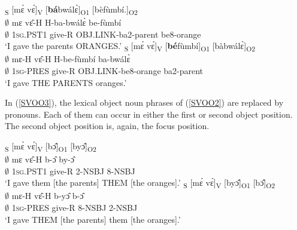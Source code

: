 \begin{exe}
\ex\label{SVOO2}
\begin{xlist}
\ex\label{SVOO2a}
  \glll [$\emptyset$]\textsubscript{S} [mɛ̀ vɛ́]\textsubscript{V} [{\bfseries bá}bwálɛ̀]\textsubscript{O1} [bèfùmbí.]\textsubscript{O2} \\
     $\emptyset$   mɛ vɛ̂-H H-ba-bwálɛ̀ be-fùmbí\\
      $\emptyset$     1\textsc{sg}.PST1 give-R OBJ.LINK-ba2-parent be8-orange  \\
    \trans `I gave the parents ORANGES.'
\ex \label{SVOO2b}
  \glll [$\emptyset$]\textsubscript{S}  [mɛ́ vɛ́]\textsubscript{V} [{\bfseries bé}fùmbí]\textsubscript{O1} [bàbwálɛ̀]\textsubscript{O2} \\
    $\emptyset$   mɛ-H vɛ̂-H H-be-fùmbí ba-bwálɛ̀ \\
      $\emptyset$   1\textsc{sg}-PRES give-R OBJ.LINK-be8-orange ba2-parent  \\
    \trans `I gave THE PARENTS oranges.'
\end{xlist}
\end{exe} 

\noindent In (\ref{SVOO3}), the lexical object noun phrases of (\ref{SVOO2}) are replaced by pronouns. Each of them can occur in either the first or second object position. The second object position is, again, the focus position.

\begin{exe}
\ex\label{SVOO3}
\begin{xlist}
\ex\label{SVOO3a}
  \glll [$\emptyset$]\textsubscript{S} [mɛ̀ vɛ́]\textsubscript{V} [bɔ̂]\textsubscript{O1} [byɔ̂]\textsubscript{O2} \\
       $\emptyset$ mɛ vɛ̂-H b-ɔ̂ by-ɔ̂\\
        $\emptyset$   1\textsc{sg}.PST1 give-R 2-NSBJ 8-NSBJ  \\
    \trans `I gave them [the parents] THEM [the oranges].'
\ex \label{SVOO3b}
  \glll [$\emptyset$]\textsubscript{S}  [mɛ́ vɛ́]\textsubscript{V} [byɔ̂]\textsubscript{O1} [bɔ̂]\textsubscript{O2} \\
      $\emptyset$ mɛ-H vɛ̂-H b-yɔ̂ b-ɔ̂\\
      $\emptyset$   1\textsc{sg}-PRES give-R 8-NSBJ 2-NSBJ \\
    \trans `I gave THEM [the parents] them [the oranges].'
\end{xlist}
\end{exe} 




